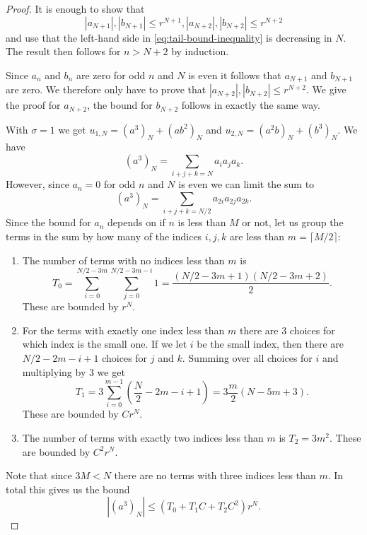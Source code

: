 \documentclass[11pt]{article}
\begin{document}
\begin{proof}
  It is enough to show that
  \begin{equation*}
    |a_{N + 1}|, |b_{N + 1}| \leq r^{N + 1},
    |a_{N + 2}|, |b_{N + 2}| \leq r^{N + 2}
  \end{equation*}
  and use that the left-hand side in \eqref{eq:tail-bound-inequality}
  is decreasing in \(N\). The result then follows for \(n > N + 2\) by
  induction.

  Since \(a_{n}\) and \(b_{n}\) are zero for odd \(n\) and \(N\) is
  even it follows that \(a_{N + 1}\) and \(b_{N + 1}\) are zero. We
  therefore only have to prove that
  \(|a_{N + 2}|, |b_{N + 2}| \leq r^{N + 2}\). We give the proof for
  \(a_{N + 2}\), the bound for \(b_{N + 2}\) follows in exactly the
  same way.

  With \(\sigma = 1\) we get \(u_{1,N} = (a^{3})_N + (ab^{2})_N\) and
  \(u_{2,N} = (a^{2}b)_N + (b^{3})_N\). We have
  \begin{equation*}
    (a^{3})_{N} = \sum_{i + j + k = N}a_{i}a_{j}a_{k}.
  \end{equation*}
  However, since \(a_{n} = 0\) for odd \(n\) and \(N\) is even we can
  limit the sum to
  \begin{equation*}
    (a^{3})_{N} = \sum_{i + j + k = N/2}a_{2i}a_{2j}a_{2k}.
  \end{equation*}
  Since the bound for \(a_{n}\) depends on if \(n\) is less than \(M\)
  or not, let us group the terms in the sum by how many of the indices
  \(i, j, k\) are less than \(m = \lceil M / 2 \rceil\):
  \begin{enumerate}
  \item The number of terms with no indices less than \(m\) is
    \begin{equation*}
      T_{0} = \sum_{i = 0}^{N/2 - 3m}\sum_{j = 0}^{N/2 - 3m - i} 1 = \frac{(N/2 - 3m + 1)(N/2 - 3m + 2)}{2}.
    \end{equation*}
    These are bounded by \(r^{N}\).
  \item For the terms with exactly one index less than \(m\) there are
    \(3\) choices for which index is the small one. If we let \(i\) be
    the small index, then there are \(N / 2 - 2m - i + 1\) choices for
    \(j\) and \(k\). Summing over all choices for \(i\) and
    multiplying by \(3\) we get
    \begin{equation*}
      T_{1} = 3\sum_{i = 0}^{m - 1} (\frac{N}{2} - 2m - i + 1) = 3\frac{m}{2}\left(N - 5m + 3\right).
    \end{equation*}
    These are bounded by \(Cr^{N}\).
  \item The number of terms with exactly two indices less than \(m\)
    is \(T_{2} = 3m^{2}\). These are bounded by \(C^{2}r^{N}\).
  \end{enumerate}
  Note that since \(3M < N\) there are no terms with three indices
  less than \(m\). In total this gives us the bound
  \begin{equation*}
    |(a^{3})_{N}| \leq (T_{0} + T_{1}C + T_{2}C^{2})r^{N}.
  \end{equation*}


\end{proof}
\end{document}
